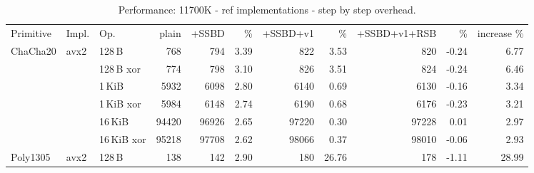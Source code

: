 \setlength{\tabcolsep}{3pt}
\begin{table}[H]
    \caption{Performance: 11700K - ref implementations - step by step overhead.}
    \label{tab:results:all:step:11700K:ref}
  \begin{tabular}{lllrrrrrrrr}
  \toprule
    Primitive
 & Impl. & Op.          & plain & +SSBD & \% & +SSBD+v1 & \% & +SSBD+v1+RSB & \% & increase \% \\

    \multirow{6}{*}{ChaCha20}
 &  \multirow{6}{*}{avx2}
        & 128\,B        & 768
                        & 794
                        & 3.39
                        & 822
                        & 3.53
                        & 820
                        & -0.24
                        & 6.77 \\

 &      & 128\,B xor    & 774
                        & 798
                        & 3.10
                        & 826
                        & 3.51
                        & 824
                        & -0.24
                        & 6.46 \\

 &      & 1\,KiB        & 5932
                        & 6098
                        & 2.80
                        & 6140
                        & 0.69
                        & 6130
                        & -0.16
                        & 3.34 \\

 &      & 1\,KiB xor    & 5984
                        & 6148
                        & 2.74
                        & 6190
                        & 0.68
                        & 6176
                        & -0.23
                        & 3.21 \\

 &      & 16\,KiB       & 94420
                        & 96926
                        & 2.65
                        & 97220
                        & 0.30
                        & 97228
                        & 0.01
                        & 2.97 \\

 &      & 16\,KiB xor   & 95218
                        & 97708
                        & 2.62
                        & 98066
                        & 0.37
                        & 98010
                        & -0.06
                        & 2.93 \\

     \midrule
    \multirow{6}{*}{Poly1305}
 &  \multirow{6}{*}{avx2}
        & 128\,B        & 138
                        & 142
                        & 2.90
                        & 180
                        & 26.76
                        & 178
                        & -1.11
                        & 28.99 \\


\end{tabular}
\end{table}
